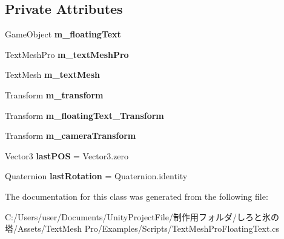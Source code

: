 \subsection*{Private Attributes}
\begin{DoxyCompactItemize}
\item 
\mbox{\label{class_t_m_pro_1_1_examples_1_1_text_mesh_pro_floating_text_a301544d6e8c542a6ed7faaaadaf2a6b3}} 
Game\+Object {\bfseries m\+\_\+floating\+Text}
\item 
\mbox{\label{class_t_m_pro_1_1_examples_1_1_text_mesh_pro_floating_text_a508d4d049c49e74757b0c9c662ba0f4f}} 
Text\+Mesh\+Pro {\bfseries m\+\_\+text\+Mesh\+Pro}
\item 
\mbox{\label{class_t_m_pro_1_1_examples_1_1_text_mesh_pro_floating_text_a3ce8ff1ed7fa3998263d6a0a9855f1c7}} 
Text\+Mesh {\bfseries m\+\_\+text\+Mesh}
\item 
\mbox{\label{class_t_m_pro_1_1_examples_1_1_text_mesh_pro_floating_text_a16373b0064a29ebb506bcd293f28f8c6}} 
Transform {\bfseries m\+\_\+transform}
\item 
\mbox{\label{class_t_m_pro_1_1_examples_1_1_text_mesh_pro_floating_text_a7ca532aa895847c94e8274018b6b7fe4}} 
Transform {\bfseries m\+\_\+floating\+Text\+\_\+\+Transform}
\item 
\mbox{\label{class_t_m_pro_1_1_examples_1_1_text_mesh_pro_floating_text_a11ed6f58b4ccee4bbd07753374f1b9d0}} 
Transform {\bfseries m\+\_\+camera\+Transform}
\item 
\mbox{\label{class_t_m_pro_1_1_examples_1_1_text_mesh_pro_floating_text_ac92be106c6daad064bf2c1a8275a5b4f}} 
Vector3 {\bfseries last\+P\+OS} = Vector3.\+zero
\item 
\mbox{\label{class_t_m_pro_1_1_examples_1_1_text_mesh_pro_floating_text_a0b00a2ba65cce9026243a1d2b5329eb9}} 
Quaternion {\bfseries last\+Rotation} = Quaternion.\+identity
\end{DoxyCompactItemize}


The documentation for this class was generated from the following file\+:\begin{DoxyCompactItemize}
\item 
C\+:/\+Users/user/\+Documents/\+Unity\+Project\+File/制作用フォルダ/しろと氷の塔/\+Assets/\+Text\+Mesh Pro/\+Examples/\+Scripts/Text\+Mesh\+Pro\+Floating\+Text.\+cs\end{DoxyCompactItemize}
